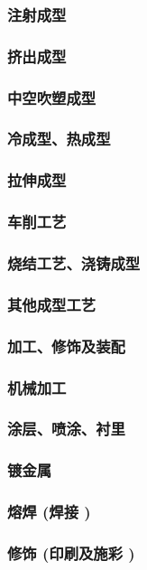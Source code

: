 \documentclass[UTF8]{../../ApplicationUniverse}
\begin{document}
            \subsubsection{注射成型}
            \subsubsection{挤出成型}
            \subsubsection{中空吹塑成型}
            \subsubsection{冷成型、热成型}
            \subsubsection{拉伸成型}
            \subsubsection{车削工艺}
            \subsubsection{烧结工艺、浇铸成型}
            \subsubsection{其他成型工艺}
        \subsubsection{加工、修饰及装配}
            \subsubsection{机械加工}
            \subsubsection{涂层、喷涂、衬里}
            \subsubsection{镀金属}
            \subsubsection{熔焊 (焊接 )}
            \subsubsection{修饰 (印刷及施彩 )}
\end{document}
